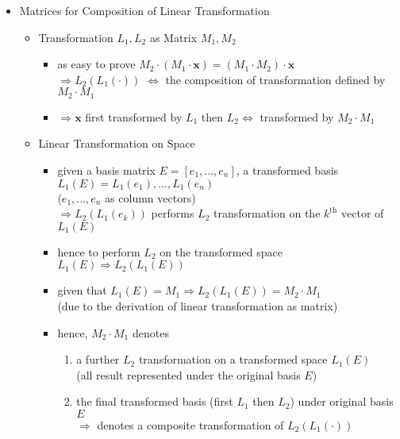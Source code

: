 \begin{itemize}
\item Matrices for Composition of Linear Transformation
	\begin{itemize}
	\item Transformation $L_1, L_2$ as Matrix $M_1, M_2$
		\begin{itemize}
		\item as easy to prove $M_2\cdot (M_1 \cdot \mathbf x) = (M_1\cdot M_2) \cdot \mathbf x$ \\
		$\Rightarrow L_2(L_1(\cdot))$ $\Leftrightarrow$ the composition of transformation defined by $M_2\cdot M_1$
		\item $\Rightarrow \mathbf x$ first transformed by $L_1$ then $L_2 \Leftrightarrow$ transformed by $M_2\cdot M_1$ 
		\end{itemize}
	\item Linear Transformation on Space
		\begin{itemize}
		\item given a basis matrix $E = [e_1,...,e_n]$, a transformed basis $L_1(E) = L_1(e_1), ..., L_1(e_n)$ \\
		($e_1,...,e_n$ as column vectors) \\
		$\Rightarrow L_2(L_1(e_k))$ performs $L_2$ transformation on the $k^\text{th}$ vector of $L_1(E)$
		\item hence to perform $L_2$ on the transformed space $L_1(E) \Rightarrow L_2(L_1(E))$
		\item given that $L_1(E) = M_1 \Rightarrow L_2(L_1(E)) = M_2 \cdot M_1$ \\ 
		(due to the derivation of linear transformation as matrix)
		\item hence, $M_2\cdot M_1$ denotes 
			\begin{enumerate}
			\item a further $L_2$ transformation on a transformed space $L_1(E)$ \\
			(all result represented under the original basis $E$)
			\item the final transformed basis (first $L_1$ then $L_2$) under original basis $E$ \\
			$\Rightarrow$ denotes a composite transformation of $L_2(L_1(\cdot))$
			\end{enumerate}
		

\end{itemize}
\end{itemize}
\end{itemize}
